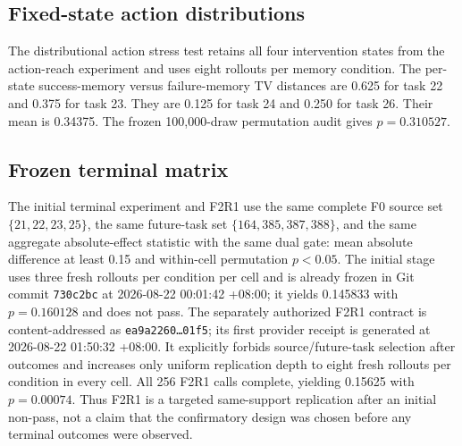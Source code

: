 \subsection{Fixed-state action distributions}
The distributional action stress test retains all four intervention states from the action-reach experiment and uses eight rollouts per memory condition. The per-state success-memory versus failure-memory TV distances are 0.625 for task 22 and 0.375 for task 23. They are 0.125 for task 24 and 0.250 for task 26. Their mean is 0.34375. The frozen 100,000-draw permutation audit gives $p=0.310527$.

\subsection{Frozen terminal matrix}
The initial terminal experiment and F2R1 use the same complete F0 source set $\{21,22,23,25\}$, the same future-task set $\{164,385,387,388\}$, and the same aggregate absolute-effect statistic with the same dual gate: mean absolute difference at least 0.15 and within-cell permutation $p<0.05$. The initial stage uses three fresh rollouts per condition per cell and is already frozen in Git commit \texttt{730c2bc} at 2026-08-22 00:01:42 +08:00; it yields 0.145833 with $p=0.160128$ and does not pass. The separately authorized F2R1 contract is content-addressed as \texttt{ea9a2260\ldots01f5}; its first provider receipt is generated at 2026-08-22 01:50:32 +08:00. It explicitly forbids source/future-task selection after outcomes and increases only uniform replication depth to eight fresh rollouts per condition in every cell. All 256 F2R1 calls complete, yielding 0.15625 with $p=0.00074$. Thus F2R1 is a targeted same-support replication after an initial non-pass, not a claim that the confirmatory design was chosen before any terminal outcomes were observed.

